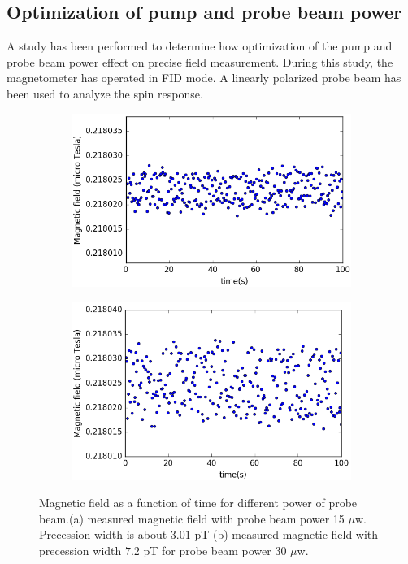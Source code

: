    \subsection{Optimization of pump and probe beam power} 
 A study has been performed to determine how optimization of the pump and probe beam power effect on precise field measurement.  During this study, the magnetometer has operated in FID mode.  A  linearly polarized probe beam has been used to analyze the spin response. 
  \begin{figure}
    \centering
    \begin{subfigure}[b]{0.7\textwidth}
        \centering
        \includegraphics[width=\textwidth]{figures/beam_power_less}
        \caption{}
        \label{fig:power less}
    \end{subfigure}

    \begin{subfigure}[b]{0.7\textwidth}
        \centering
        \includegraphics[width=\textwidth]{figures/beam_power_double}
        \caption{}
        \label{fig:power double}
    \end{subfigure}
    \caption{ Magnetic field as a function of time for different power of probe beam.(a) measured magnetic field with probe beam power 15 $\mu$w. Precession width is about $3.01$ pT (b) measured magnetic field with precession width $7.2$ pT for probe beam power 30 $\mu$w.}
    \label{fig:different probe power}
\end{figure}
 
